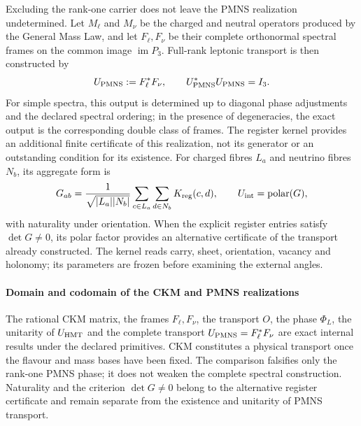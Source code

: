 Excluding the rank-one carrier does not leave the PMNS realization undetermined. Let \(M_\ell\) and \(M_\nu\) be the charged and neutral operators produced by the General Mass Law, and let \(F_\ell,F_\nu\) be their complete orthonormal spectral frames on the common image \(\operatorname{im}P_3\). Full-rank leptonic transport is then constructed by
\[
 U_{\rm PMNS}:=F_\ell^*F_\nu,
 \qquad
 U_{\rm PMNS}^*U_{\rm PMNS}=I_3.
\]
For simple spectra, this output is determined up to diagonal phase adjustments and the declared spectral ordering; in the presence of degeneracies, the exact output is the corresponding double class of frames. The register kernel provides an additional finite certificate of this realization, not its generator or an outstanding condition for its existence. For charged fibres \(L_a\) and neutrino fibres \(N_b\), its aggregate form is
\[
 G_{ab}=\frac{1}{\sqrt{|L_a||N_b|}}
 \sum_{c\in L_a}\sum_{d\in N_b}K_{\rm reg}(c,d),
 \qquad U_{\rm int}=\operatorname{polar}(G),
\]
with naturality under orientation. When the explicit register entries satisfy \(\det G\ne0\), its polar factor provides an alternative certificate of the transport already constructed. The kernel reads carry, sheet, orientation, vacancy and holonomy; its parameters are frozen before examining the external angles.

\paragraph{Domain and codomain of the CKM and PMNS realizations}
The rational CKM matrix, the frames \(F_\ell,F_\nu\), the transport \(O\), the phase \(\Phi_L\), the unitarity of \(U_{\rm HMT}\) and the complete transport \(U_{\rm PMNS}=F_\ell^*F_\nu\) are exact internal results under the declared primitives. CKM constitutes a physical transport once the flavour and mass bases have been fixed. The comparison falsifies only the rank-one PMNS phase; it does not weaken the complete spectral construction. Naturality and the criterion \(\det G\ne0\) belong to the alternative register certificate and remain separate from the existence and unitarity of PMNS transport.
